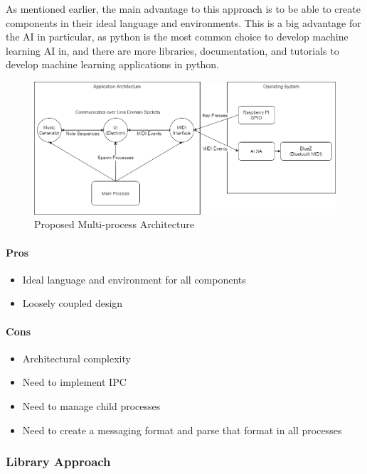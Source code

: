 As mentioned earlier, the main advantage to this approach is to be able to create
components in their ideal language and environments. This is a big advantage for the AI in
particular, as python is the most common choice to develop machine learning AI in, and
there are more libraries, documentation, and tutorials to develop machine learning
applications in python.

\begin{figure}[h!]
  \centering
  \includegraphics[width=\linewidth]{image/multiprocess.png}
  \caption{Proposed Multi-process Architecture}
  \label{fig:multiprocess}
\end{figure}

\paragraph{Pros}

\begin{itemize}
  \item Ideal language and environment for all components
  \item Loosely coupled design
\end{itemize}

\paragraph{Cons}

\begin{itemize}
  \item Architectural complexity
  \item Need to implement IPC
  \item Need to manage child processes
  \item Need to create a messaging format and parse that format in all processes
\end{itemize}

\subsubsection{Library Approach}

